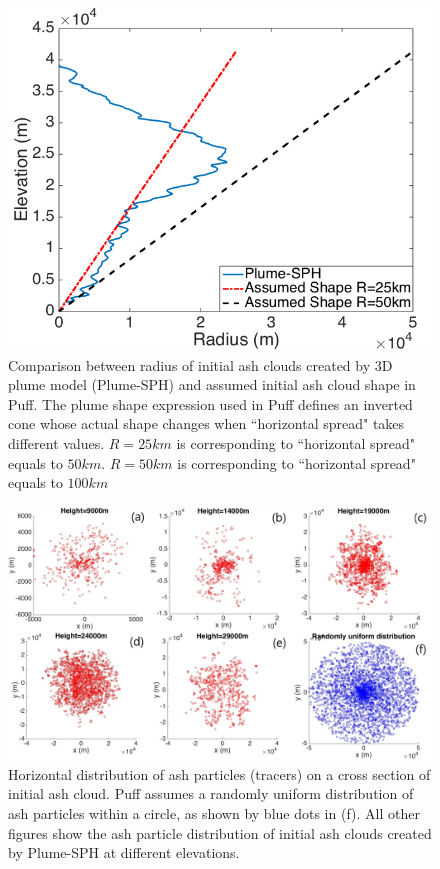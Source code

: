 \documentclass[utf8]{frontiersSCNS} %
\begin{document}
\begin{figure}[!htb]
\centering
\includegraphics[width=0.50 \textwidth]{Figures/radius-Plume-SPH-And-Assumed}
\caption{Comparison between radius of initial ash clouds created by 3D plume model (Plume-SPH) and assumed initial ash cloud shape in Puff. The plume shape expression used in Puff defines an inverted cone whose actual shape changes when ``horizontal spread" takes different values. $R=25km$ is corresponding to ``horizontal spread" equals to $50km$. $R=50km$ is corresponding to ``horizontal spread" equals to $100km$}
\label{fig:radius-comparison}
\end{figure}

\begin{figure}[!htb]
\centering
\includegraphics[width=1.0\textwidth]{Figures/particle_horizontal_distribution}
\caption{Horizontal distribution of ash particles (tracers) on a cross section of initial ash cloud. Puff assumes a randomly uniform distribution of ash particles within a circle, as shown by blue dots in (f). All other figures show the ash particle distribution of initial ash clouds created by Plume-SPH at different elevations.}
\label{fig:initial-cloud-horizontal}
\end{figure}
\end{document}
